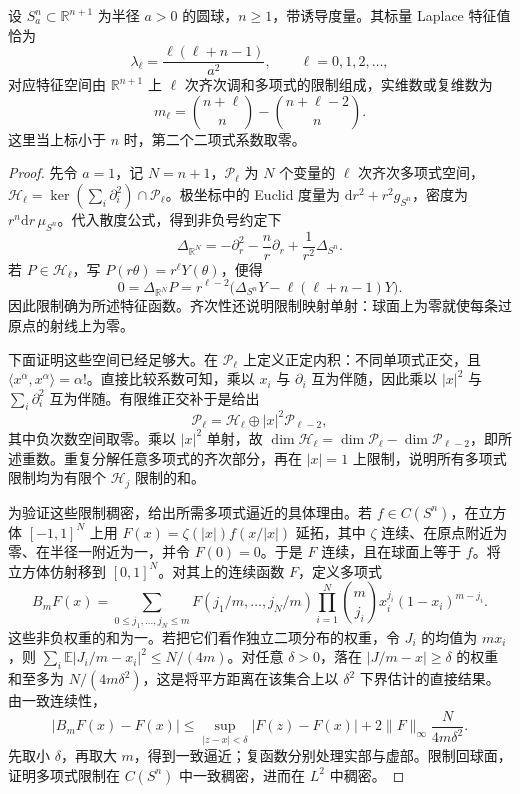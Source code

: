 \begin{theorem}\label{g3:thm:sphere-function-spectrum}
	设 \(S_a^n\subset\mathbb R^{n+1}\) 为半径 \(a>0\) 的圆球，\(n\ge1\)，带诱导度量。其标量 Laplace 特征值恰为
	\begin{equation}\label{g3:eq:sphere-function-spectrum}
		\lambda_\ell=\frac{\ell(\ell+n-1)}{a^2},\qquad \ell=0,1,2,\ldots,
	\end{equation}
	对应特征空间由 \(\mathbb R^{n+1}\) 上 \(\ell\) 次齐次调和多项式的限制组成，实维数或复维数为
	\[
		m_\ell=\binom{n+\ell}{n}-\binom{n+\ell-2}{n}.
	\]
	这里当上标小于 \(n\) 时，第二个二项式系数取零。
\end{theorem}
\begin{proof}
	先令 \(a=1\)，记 \(N=n+1\)，\(\mathcal P_\ell\) 为 \(N\) 个变量的 \(\ell\) 次齐次多项式空间，\(\mathcal H_\ell=\ker(\sum_i\partial_i^2)\cap\mathcal P_\ell\)。极坐标中的 Euclid 度量为 \(\mathrm dr^2+r^2g_{S^n}\)，密度为 \(r^n\mathrm dr\,\mu_{S^n}\)。代入散度公式，得到非负号约定下
	\[
		\Delta_{\mathbb R^N}
		=-\partial_r^2-\frac nr\partial_r+\frac1{r^2}\Delta_{S^n}.
	\]
	若 \(P\in\mathcal H_\ell\)，写 \(P(r\theta)=r^\ell Y(\theta)\)，便得
	\[
		0=\Delta_{\mathbb R^N}P
		=r^{\ell-2}\bigl(\Delta_{S^n}Y-\ell(\ell+n-1)Y\bigr).
	\]
	因此限制确为所述特征函数。齐次性还说明限制映射单射：球面上为零就使每条过原点的射线上为零。

	下面证明这些空间已经足够大。在 \(\mathcal P_\ell\) 上定义正定内积：不同单项式正交，且 \(\langle x^\alpha,x^\alpha\rangle=\alpha!\)。直接比较系数可知，乘以 \(x_i\) 与 \(\partial_i\) 互为伴随，因此乘以 \(|x|^2\) 与 \(\sum_i\partial_i^2\) 互为伴随。有限维正交补于是给出
	\[
		\mathcal P_\ell=\mathcal H_\ell\oplus |x|^2\mathcal P_{\ell-2},
	\]
	其中负次数空间取零。乘以 \(|x|^2\) 单射，故
	\(\dim\mathcal H_\ell=\dim\mathcal P_\ell-\dim\mathcal P_{\ell-2}\)，即所述重数。重复分解任意多项式的齐次部分，再在 \(|x|=1\) 上限制，说明所有多项式限制均为有限个 \(\mathcal H_j\) 限制的和。

	为验证这些限制稠密，给出所需多项式逼近的具体理由。若 \(f\in C(S^n)\)，在立方体 \([-1,1]^N\) 上用
	\(F(x)=\zeta(|x|)f(x/|x|)\) 延拓，其中 \(\zeta\) 连续、在原点附近为零、在半径一附近为一，并令 \(F(0)=0\)。于是 \(F\) 连续，且在球面上等于 \(f\)。将立方体仿射移到 \([0,1]^N\)。对其上的连续函数 \(F\)，定义多项式
	\[
		B_mF(x)=\sum_{0\le j_1,\ldots,j_N\le m}
		F(j_1/m,\ldots,j_N/m)
		\prod_{i=1}^N\binom m{j_i}x_i^{j_i}(1-x_i)^{m-j_i}.
	\]
	这些非负权重的和为一。若把它们看作独立二项分布的权重，令 \(J_i\) 的均值为 \(mx_i\)，则
	\(\sum_i\mathbb E|J_i/m-x_i|^2\le N/(4m)\)。对任意 \(\delta>0\)，落在 \(|J/m-x|\ge\delta\) 的权重和至多为 \(N/(4m\delta^2)\)，这是将平方距离在该集合上以 \(\delta^2\) 下界估计的直接结果。由一致连续性，
	\[
		|B_mF(x)-F(x)|
		\le\sup_{|z-x|<\delta}|F(z)-F(x)|
		 +2\|F\|_\infty\frac{N}{4m\delta^2}.
	\]
	先取小 \(\delta\)，再取大 \(m\)，得到一致逼近；复函数分别处理实部与虚部。限制回球面，证明多项式限制在 \(C(S^n)\) 中一致稠密，进而在 \(L^2\) 中稠密。


\end{proof}
